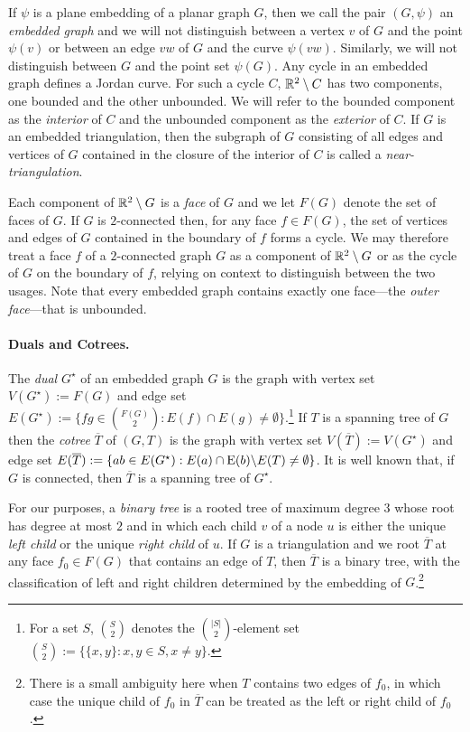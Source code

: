 \documentclass{patmorin}
\begin{document}
If $\psi$ is a plane embedding of a planar graph $G$, then we call the pair $(G,\psi)$ an \emph{embedded graph} and we will not distinguish between a vertex $v$ of $G$ and the point $\psi(v)$ or between an edge $vw$ of $G$ and the curve $\psi(vw)$.  Similarly, we will not distinguish between $G$ and the  point set $\psi(G)$.  Any cycle in an embedded graph defines a Jordan curve. For such a cycle $C$, $\mathbb{R}^2\setminus C$ has two components, one bounded and the other unbounded. We will refer to the bounded component as the \emph{interior} of $C$ and the unbounded component as the \emph{exterior} of $C$.  If $G$ is an embedded triangulation, then the subgraph of $G$ consisting of all edges and vertices of $G$ contained in the closure of the interior of $C$ is called a \emph{near-triangulation}.

Each component of $\mathbb{R}^2\setminus G$ is a \emph{face} of $G$ and we let $F(G)$ denote the set of faces of $G$.  If $G$ is $2$-connected then, for any face $f\in F(G)$, the set of vertices and edges of $G$ contained in the boundary of $f$ forms a cycle.  We may therefore treat a face $f$ of a $2$-connected graph $G$ as a component of $\mathbb{R}^2\setminus G$ or as the cycle of $G$ on the boundary of $f$, relying on context to distinguish between the two usages.  Note that every embedded graph contains exactly one face---the \emph{outer face}---that is unbounded.

\paragraph{Duals and Cotrees.}

The \emph{dual} $G^\star$ of an embedded graph $G$ is the graph with vertex set $V(G^\star):=F(G)$ and edge set $E(G^{\star}):=\{fg\in \binom{F(G)}{2}:E(f)\cap E(g)\neq\emptyset\}$.\footnote{For a set $S$, $\binom{S}{2}$ denotes the $\binom{|S|}{2}$-element set $\binom{S}{2}:=\{\{x,y\}:x,y\in S, x\neq y\}$.} If $T$ is a spanning tree of $G$ then the \emph{cotree} $\overline{T}$ of $(G,T)$ is the graph with vertex set $V(\overline{T}) := V(G^\star)$ and edge set $E(\overline{T}) := \{ab \in E(G^\star) : E(a) \cap \mathrm{E}(b) \backslash E(T) \neq \emptyset \}$. It is well known that, if $G$ is connected, then $\overline{T}$ is a spanning tree of $G^\star$.

For our purposes, a \emph{binary tree} is a rooted tree of maximum degree $3$ whose root has degree at most $2$ and in which each child $v$ of a node $u$ is either the unique \emph{left child} or the unique \emph{right child} of $u$.  If $G$ is a triangulation  and we root $\overline{T}$ at any face $f_0\in F(G)$ that contains an edge of $T$, then $\overline{T}$ is a binary tree, with the classification of left and right children determined by the embedding of $G$.\footnote{There is a small ambiguity here when $T$ contains two edges of $f_0$, in which case the unique child of $f_0$ in $\overline{T}$ can be treated as the left or right child of $f_0$.}
\end{document}
